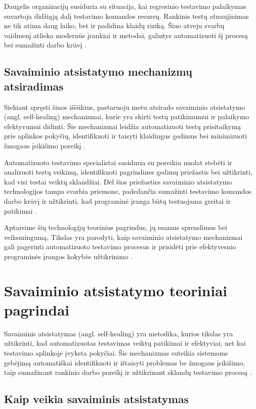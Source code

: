 \documentclass[
]{VUMIFPSkursinis}
\begin{document}
Daugelis organizacijų susiduria su situacija, kai regresinio testavimo palaikymas suvartoja didžiąją dalį testavimo komandos resursų. Rankinis testų atnaujinimas ne tik atima daug laiko, bet ir padidina klaidų riziką. Šiuo atveju svarbų vaidmenį atlieka modernūs įrankiai ir metodai, galintys automatizuoti šį procesą bei sumažinti darbo krūvį \cite{whittaker2000}.

\subsection{Savaiminio atsistatymo mechanizmų atsiradimas}

Siekiant spręsti šiuos iššūkius, pastaruoju metu atsirado savaiminio atsistatymo (angl. self-healing) mechanizmai, kurie yra skirti testų patikimumui ir palaikymo efektyvumui didinti. Šie mechanizmai leidžia automatizuoti testų prisitaikymą prie aplinkos pokyčių, identifikuoti ir taisyti klaidingus gedimus bei minimizuoti žmogaus įsikišimo poreikį \cite{eck2020}.

Automatizuoto testavimo specialistai susiduria su poreikiu nuolat stebėti ir analizuoti testų veikimą, identifikuoti pagrindines gedimų priežastis bei užtikrinti, kad visi testai veiktų sklandžiai. Dėl šios priežasties savaiminio atsistatymo technologijos tampa svarbia priemone, padedančia sumažinti testavimo komandos darbo krūvį ir užtikrinti, kad programinė įranga būtų testuojama greitai ir patikimai \cite{zimmermann2019}.

Aptarsime šių technologijų teorinius pagrindus, jų esamus sprendimus bei veiksmingumą. Tikslas yra parodyti, kaip savaiminio atsistatymo mechanizmai gali pagerinti automatizuoto testavimo procesus ir prisidėti prie efektyvesnio programinės įrangos kokybės užtikrinimo \cite{harman2012}.

\section{Savaiminio atsistatymo teoriniai pagrindai}

Savaiminis atsistatymas (angl. self-healing) yra metodika, kurios tikslas yra užtikrinti, kad automatizuotas testavimas veiktų patikimai ir efektyviai, net kai testavimo aplinkoje įvyksta pokyčiai. Šis mechanizmas suteikia sistemoms gebėjimą automatiškai identifikuoti ir ištaisyti problemas be žmogaus įsikišimo, taip sumažinant rankinio darbo poreikį ir užtikrinant sklandų testavimo procesą \cite{lemos2020} \cite{camara2019}.

\subsection{Kaip veikia savaiminis atsistatymas}
\end{document}
